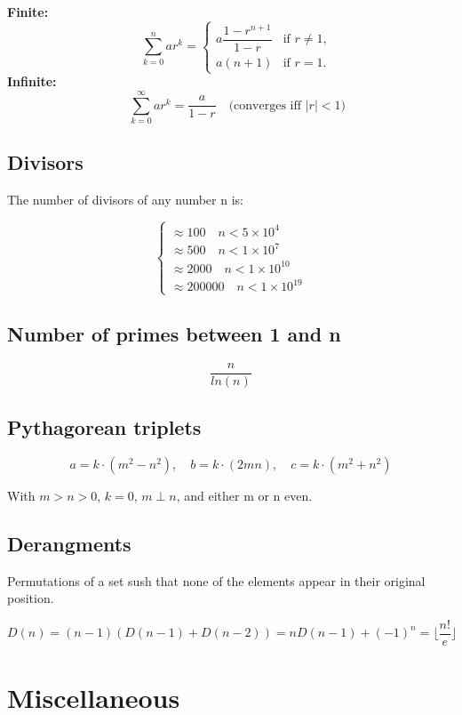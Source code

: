 \documentclass[10pt]{article}
\begin{document}
\begin{multicols*}{2}
\textbf{Finite:} \[\quad \sum_{k=0}^{n} ar^k = 
\begin{cases} 
a \dfrac{1 - r^{n+1}}{1 - r} & \text{if } r \neq 1, \\
a(n + 1) & \text{if } r = 1.
\end{cases}
\]
\textbf{Infinite:} \[\quad \sum_{k=0}^{\infty} ar^k = \frac{a}{1 - r} \quad \text{(converges iff } |r| < 1\text{)}
\]
\subsection{Divisors}

The number of divisors of any number n is:

\[
\begin{cases}
    \approx 100 \quad n< 5 \times 10^4 \\
    \approx 500 \quad n<1 \times 10^7 \\
    \approx 2000 \quad n < 1 \times 10^10 \\
    \approx 200000 \quad n < 1 \times 10^19
\end{cases}
\]

\subsection{Number of primes between 1 and n}

\[
\frac{n}{ln(n)}
\]


\subsection{Pythagorean triplets}

\[
a = k \cdot (m^2 - n^2), \quad b = k\cdot(2mn), \quad c = k\cdot(m^2+n^2)
\]

With $m>n>0$, $k=0$, $m\perp n$, and either m or n even.


\subsection{Derangments}

Permutations of a set sush that none of the elements appear in their original position.

\[
D(n) = (n-1)(D(n-1)+D(n-2)) = nD(n-1)+(-1)^n = \lfloor \frac{n!}{e}\rfloor
\]

\section{Miscellaneous}


\end{multicols*}
\end{document}
